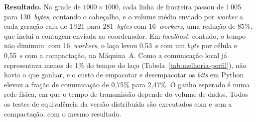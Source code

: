 \textbf{Resultado.} Na grade de $1000 \times 1000$, cada linha de fronteira passou de 1\,005 para 130~\textit{bytes}, contando o cabeçalho, e o volume médio enviado por \textit{worker} a cada geração caiu de 1\,921 para 281~\textit{bytes} com 16~\textit{workers}, uma redução de 85\%, que inclui a contagem enviada ao coordenador. Em \textit{localhost}, contudo, o tempo não diminuiu: com 16~\textit{workers}, o laço levou 0,53~s com um \textit{byte} por célula e 0,55~s com a compactação, na Máquina~A. Como a comunicação local já representava menos de 1\% do tempo do laço (Tabela~\ref{tab:melhoria-perfil}), não havia o que ganhar, e o custo de empacotar e desempacotar os \textit{bits} em Python elevou a fração de comunicação de 0,75\% para 2,47\%. O ganho esperado é numa rede física, em que o tempo de transmissão depende do volume de dados. Todos os testes de equivalência da versão distribuída são executados com e sem a compactação, com o mesmo resultado. 

